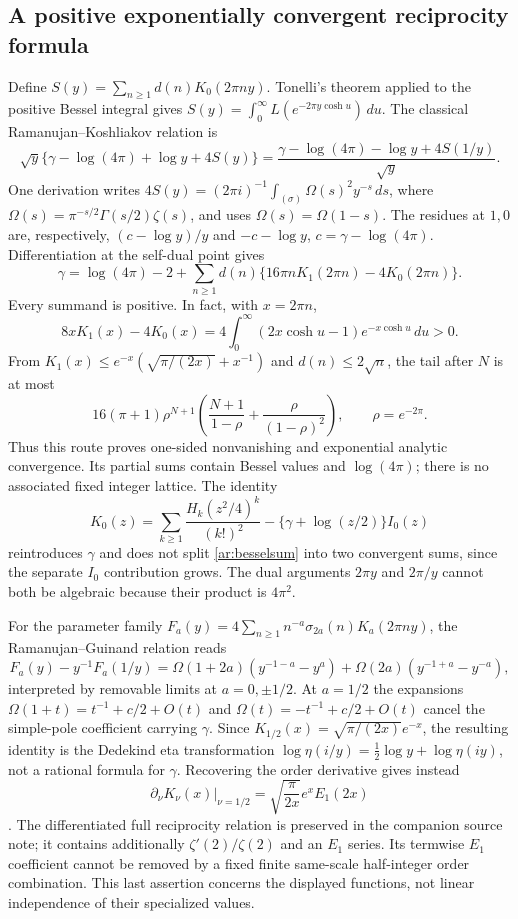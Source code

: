 \documentclass[11pt,a4paper]{article}
\theoremstyle{definition}
\theoremstyle{remark}
\numberwithin{equation}{section}
\begin{document}
\subsection{A positive exponentially convergent reciprocity formula}
Define $S(y)=\sum_{n\ge1}d(n)K_0(2\pi ny)$.  Tonelli's theorem applied
to the positive Bessel integral gives
$S(y)=\int_0^\infty L(e^{-2\pi y\cosh u})\,du$.
The classical Ramanujan--Koshliakov relation \cite{ar:DixitKumar} is
\[
 \sqrt y\{\gamma-\log(4\pi)+\log y+4S(y)\}
 =\frac{\gamma-\log(4\pi)-\log y+4S(1/y)}{\sqrt y}.
\]
One derivation writes
$4S(y)=(2\pi i)^{-1}\int_{(\sigma)}\Omega(s)^2y^{-s}\,ds$, where
$\Omega(s)=\pi^{-s/2}\Gamma(s/2)\zeta(s)$, and uses
$\Omega(s)=\Omega(1-s)$.  The residues at $1,0$ are, respectively,
$(c-\log y)/y$ and $-c-\log y$, $c=\gamma-\log(4\pi)$.
Differentiation at the self-dual point gives
\begin{equation}\label{ar:besselsum}
 \gamma=\log(4\pi)-2+
 \sum_{n\ge1}d(n)\{16\pi nK_1(2\pi n)-4K_0(2\pi n)\}.
\end{equation}
Every summand is positive.  In fact, with $x=2\pi n$,
\[
 8xK_1(x)-4K_0(x)
 =4\int_0^\infty(2x\cosh u-1)e^{-x\cosh u}\,du>0.
\]
From $K_1(x)\le e^{-x}(\sqrt{\pi/(2x)}+x^{-1})$ and
$d(n)\le2\sqrt n$, the tail after $N$ is at most
\begin{equation}\label{ar:besseltail}
 16(\pi+1)\rho^{N+1}
 \left(\frac{N+1}{1-\rho}+\frac\rho{(1-\rho)^2}\right),
 \qquad \rho=e^{-2\pi}.
\end{equation}
Thus this route proves one-sided nonvanishing and exponential analytic
convergence.  Its partial sums contain Bessel values and $\log(4\pi)$;
there is no associated fixed integer lattice.  The identity
\[
 K_0(z)=\sum_{k\ge1}\frac{H_k(z^2/4)^k}{(k!)^2}
       -\{\gamma+\log(z/2)\}I_0(z)
\]
reintroduces $\gamma$ and does not split \eqref{ar:besselsum} into two
convergent sums, since the separate $I_0$ contribution grows.  The dual
arguments $2\pi y$ and $2\pi/y$ cannot both be algebraic because their
product is $4\pi^2$.

For the parameter family
$F_a(y)=4\sum_{n\ge1}n^{-a}\sigma_{2a}(n)K_a(2\pi ny)$, the
Ramanujan--Guinand relation reads
\[
 F_a(y)-y^{-1}F_a(1/y)=
 \Omega(1+2a)(y^{-1-a}-y^a)+
 \Omega(2a)(y^{-1+a}-y^{-a}),
\]
interpreted by removable limits at $a=0,\pm1/2$.  At $a=1/2$ the
expansions
$\Omega(1+t)=t^{-1}+c/2+O(t)$ and
$\Omega(t)=-t^{-1}+c/2+O(t)$ cancel the simple-pole coefficient carrying
$\gamma$.  Since $K_{1/2}(x)=\sqrt{\pi/(2x)}e^{-x}$, the resulting
identity is the Dedekind eta transformation
$\log\eta(i/y)=\tfrac12\log y+\log\eta(iy)$, not a rational formula
for $\gamma$.  Recovering the order derivative gives instead
\begin{equation}\label{ar:besseldegree}
 \left.\partial_\nu K_\nu(x)\right|_{\nu=1/2}
 =\sqrt{\frac\pi{2x}}e^xE_1(2x)
\end{equation}
\cite{ar:DLMFBessel}.  The differentiated full reciprocity relation is
preserved in the companion source note; it contains additionally
$\zeta'(2)/\zeta(2)$ and an $E_1$ series.  Its termwise $E_1$ coefficient
cannot be removed by a fixed finite same-scale half-integer order
combination.  This last assertion concerns the displayed functions, not
linear independence of their specialized values.
\end{document}
